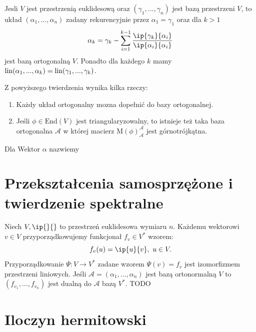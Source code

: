 \documentclass[11pt, a4paper]{article}
\begin{document}
\begin{theorem}
    Jesli \(V\) jest przestrzenią euklidesową oraz \((\gamma_1, ..., \gamma_n)\)
    jest bazą przestrzeni \(V\), to układ \((\alpha_1, ..., \alpha_n)\) zadany
    rekurencyjnie przez \(\alpha_1 = \gamma_1\) oraz dla \(k > 1\)
    \[
        \alpha_k = \gamma_k - \sum_{i = 1}^{k - 1}
        \frac{\ip{\gamma_k}{\alpha_i}}{\ip{\alpha_i}{\alpha_i}}
    \]
    jest bazą ortogonalną \(V\). Ponadto dla każdego \(k\) mamy
    \(\textnormal{lin}(\alpha_1, ..., \alpha_k) = \textnormal{lin}(\gamma_1, ..., \gamma_k)\).
\end{theorem}

\begin{remark}
    Z powyższego twierdzenia wynika kilka rzeczy:
    \begin{enumerate}
        \item Każdy układ ortogonalny mozna dopełnić do bazy ortogonalnej.
        \item Jeśli \(\phi \in \text{End}(V)\) jest triangularyzowalny, to
        istnieje też taka baza ortogonalna \(\mathcal{A}\) w której macierz
        \(\text{M}(\phi)_{\mathcal{A}}^{\mathcal{A}}\) jest górnotrójkątna.
    \end{enumerate}
\end{remark}

\begin{definition}
    Dla \(\)Wektor \(\alpha\) nazwiemy
\end{definition}

\section{Przekształcenia samosprzężone i twierdzenie spektralne}

Niech \(V, \ip{}{}\) to przestrzeń euklidesowa wymiaru \(n\). Każdemu wektorowi
\(v \in V\) przyporządkowujemy funkcjonał \(f_v \in V^{*}\) wzorem:
\[
    f_{v}(u) = \ip{u}{v},\ u \in V.
\]
Przyporządkowanie \(\Psi: V \to V^{*}\) zadane wzorem \(\Psi(v) = f_v\) jest
izomorfizmem przestrzeni liniowych. Jeśli \(\mathcal{A} = (\alpha_1, ..., \alpha_n)\)
jest bazą ortonormalną \(V\) to \((f_{v_1}, ..., f_{v_n})\) jest dualną do
\(\mathcal{A}\) bazą \(V^{*}\).
TODO

\section{Iloczyn hermitowski}
\end{document}
